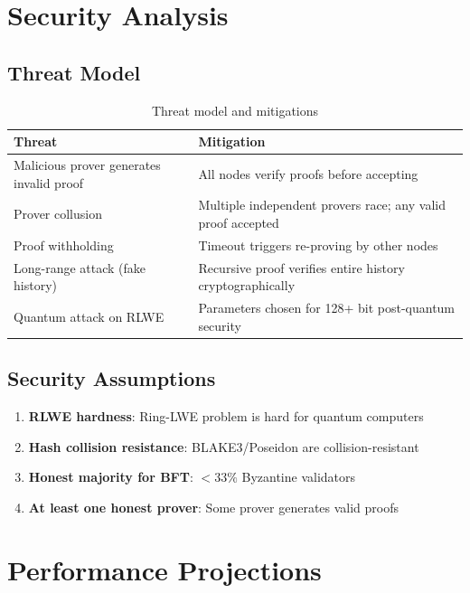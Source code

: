 \documentclass[11pt,a4paper]{article}
\begin{document}
\section{Security Analysis}

\subsection{Threat Model}

\begin{table}[h]
\centering
\begin{tabular}{p{4cm}p{8cm}}
\toprule
\textbf{Threat} & \textbf{Mitigation} \\
\midrule
Malicious prover generates invalid proof & All nodes verify proofs before accepting \\
Prover collusion & Multiple independent provers race; any valid proof accepted \\
Proof withholding & Timeout triggers re-proving by other nodes \\
Long-range attack (fake history) & Recursive proof verifies entire history cryptographically \\
Quantum attack on RLWE & Parameters chosen for 128+ bit post-quantum security \\
\bottomrule
\end{tabular}
\caption{Threat model and mitigations}
\end{table}

\subsection{Security Assumptions}

\begin{enumerate}
    \item \textbf{RLWE hardness}: Ring-LWE problem is hard for quantum computers
    \item \textbf{Hash collision resistance}: BLAKE3/Poseidon are collision-resistant
    \item \textbf{Honest majority for BFT}: $<33\%$ Byzantine validators
    \item \textbf{At least one honest prover}: Some prover generates valid proofs
\end{enumerate}

\section{Performance Projections}
\end{document}
